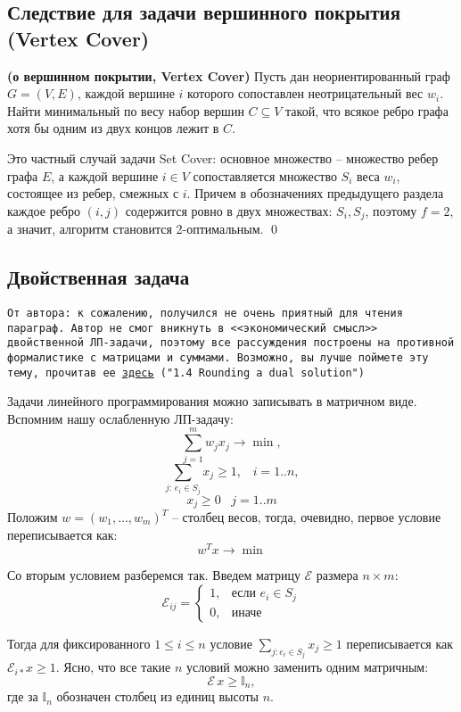 \subsection{Следствие для задачи вершинного покрытия (Vertex Cover)}
\begin{problem*}{\bfseries(о вершинном покрытии, Vertex Cover)}
	Пусть дан неориентированный граф $G = (V, E)$, каждой вершине $i$ которого сопоставлен неотрицательный вес $w_i$. Найти минимальный по весу набор вершин $C \subseteq V$ такой, что всякое ребро графа хотя бы одним из двух концов лежит в $C$.
\end{problem*}
 Это частный случай задачи Set Cover: основное множество -- множество ребер графа $E$, а каждой вершине $i \in V$ сопоставляется множество $S_i$ веса $w_i$, состоящее из ребер, смежных с $i$. Причем в обозначениях предыдущего раздела каждое ребро $(i, j)$ содержится ровно в двух множествах: $S_i, S_j$, поэтому $f = 2$, а значит, алгоритм становится 2-оптимальным. \qed

\subsection{Двойственная задача}
\texttt{От автора: к сожалению, получился не очень приятный для чтения параграф. Автор не смог вникнуть в <<экономический смысл>> двойственной ЛП-задачи, поэтому все рассуждения построены на противной формалистике с матрицами и суммами. Возможно, вы лучше поймете эту тему, прочитав ее
\texttt{\href{https://www.designofapproxalgs.com/book.pdf}{\underline{здесь}}}
("1.4 Rounding a dual solution")
}

Задачи линейного программирования можно записывать в матричном виде. Вспомним нашу ослабленную ЛП-задачу:
$$ \sum_{j=1}^m w_j x_j \rightarrow \min,$$
$$ \sum_{j:\, e_i \in S_j} x_j \geq 1, \;\;\; i=1..n,$$
$$ x_j \geq 0 \;\;\; j=1..m$$
Положим $w = (w_1, \ldots, w_m)^T$ -- столбец весов, тогда, очевидно, первое условие переписывается как: $$w^Tx \rightarrow \min$$

Со вторым условием разберемся так. Введем матрицу $\mathcal E$ размера $n \times m$:
$$
\mathcal{E}_{ij} = \begin{cases}
1, & \text{если } e_i \in S_j \\
0, & \text{иначе}
\end{cases}
$$

Тогда для фиксированного $1\leq i \leq n$ условие $\sum\limits_{j: e_i \in S_j} x_j \geq 1$ переписывается как $\mathcal{E}_{i*} x \geq 1$. Ясно, что все такие $n$ условий можно заменить одним матричным: $$\mathcal{E}\,x \geq \mathbb I_n,$$ где за $\mathbb I_n$ обозначен столбец из единиц высоты $n$.

